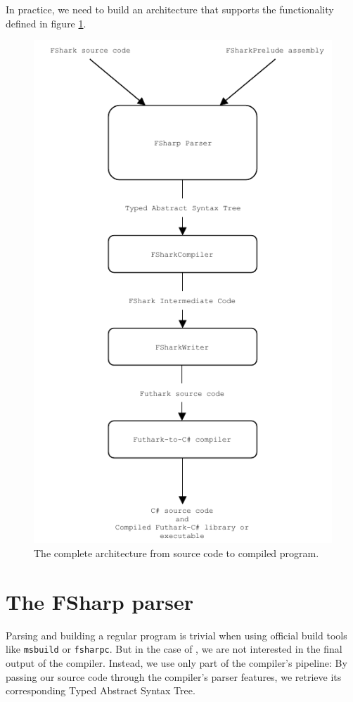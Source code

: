 In practice, we need to build an architecture that supports the functionality
defined in figure \ref{fig:fsharkcompilerarchitecture}.

\begin{figure}[H]
  \centering
  \includegraphics[scale=1.15]{chapters/figs/compilerarchitecture.pdf}
  \caption{The complete architecture from \fshark{} source code to compiled
    \csharp{} program.}
  \label{fig:fsharkcompilerarchitecture}
\end{figure}


\section{The FSharp parser}
Parsing and building a regular \fsharp{} program is trivial when using official build tools like
\texttt{msbuild} or \texttt{fsharpc}.
But in the case of \fshark{}, we are not interested in the final output of the
\fsharp{} compiler. Instead, we use only part of the \fsharp{} compiler's
pipeline: By passing our \fshark{} source code through the \fsharp{} compiler's
parser features, we retrieve its corresponding Typed Abstract Syntax Tree.

